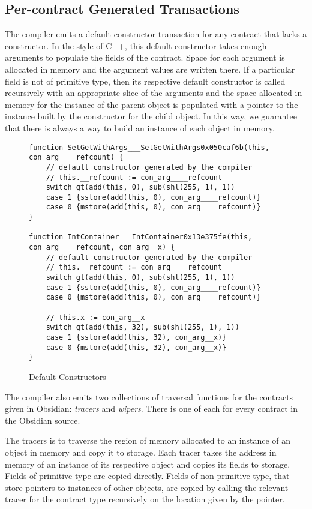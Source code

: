 \subsection{Per-contract Generated Transactions}

The compiler emits a default constructor transaction for any contract that
lacks a constructor. In the style of C++, this default constructor takes
enough arguments to populate the fields of the contract. \cite{TODO} Space
for each argument is allocated in memory and the argument values are
written there. If a particular field is not of primitive type, then its
respective default constructor is called recursively with an appropriate
slice of the arguments and the space allocated in memory for the instance
of the parent object is populated with a pointer to the instance built by
the constructor for the child object. In this way, we guarantee that there
is always a way to build an instance of each object in memory.

\begin{figure}[hbtp]
    \caption{Default Constructors}
    \label{code.3}
    \begin{lstlisting}[language=yul,frame=single]
function SetGetWithArgs___SetGetWithArgs0x050caf6b(this, con_arg____refcount) {
    // default constructor generated by the compiler
    // this.__refcount := con_arg____refcount
    switch gt(add(this, 0), sub(shl(255, 1), 1))
    case 1 {sstore(add(this, 0), con_arg____refcount)}
    case 0 {mstore(add(this, 0), con_arg____refcount)}
}

function IntContainer___IntContainer0x13e375fe(this, con_arg____refcount, con_arg__x) {
    // default constructor generated by the compiler
    // this.__refcount := con_arg____refcount
    switch gt(add(this, 0), sub(shl(255, 1), 1))
    case 1 {sstore(add(this, 0), con_arg____refcount)}
    case 0 {mstore(add(this, 0), con_arg____refcount)}

    // this.x := con_arg__x
    switch gt(add(this, 32), sub(shl(255, 1), 1))
    case 1 {sstore(add(this, 32), con_arg__x)}
    case 0 {mstore(add(this, 32), con_arg__x)}
}
\end{lstlisting}
\end{figure}

The compiler also emits two collections of traversal functions for the
contracts given in Obsidian: \emph{tracers} and \emph{wipers}. There is one
of each for every contract in the Obsidian source.

The tracers is to traverse the region of memory allocated to an instance of
an object in memory and copy it to storage. Each tracer takes the address
in memory of an instance of its respective object and copies its fields to
storage. Fields of primitive type are copied directly. Fields of
non-primitive type, that store pointers to instances of other objects, are
copied by calling the relevant tracer for the contract type recursively on
the location given by the pointer.

